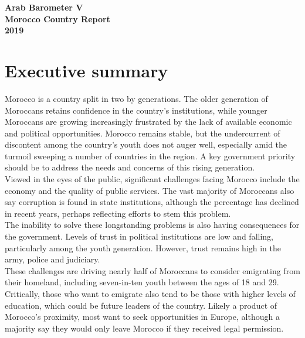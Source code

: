 \documentclass[12pt]{article}
\begin{document}
	\newpage
	\pagestyle{empty} 
	\vspace*{2in}
	\begin{center}
		\color{white}\Huge\textbf{Arab Barometer V} \\
		\vspace*{0.5in}
		\color{white}\LARGE\textbf{Morocco Country Report} \\
		\vspace*{4in}
		\color{white}\large\textbf{2019} \\
	\end{center}
	\newpage{}
	\color{gray}
	\color{gray}
	\pagestyle{fancy}
	\pagebreak
	\section*{Executive summary}
	Morocco is a country split in two by generations. The older generation of Moroccans retains confidence in the country's institutions, while younger Moroccans are growing increasingly frustrated by the lack of available economic and political opportunities. Morocco remains stable, but the undercurrent of discontent among the country's youth does not auger well, especially amid the turmoil sweeping a number of countries in the region. A key government priority should be to address the needs and concerns of this rising generation.\\
	
	\noindent Viewed in the eyes of the public, significant challenges facing Morocco include the economy and the quality of public services. The vast majority of Moroccans also say corruption is found in state institutions, although the percentage has declined in recent years, perhaps reflecting efforts to stem this problem.\\
	
	\noindent The inability to solve these longstanding problems is also having consequences for the government.  Levels of trust in political institutions are low and falling, particularly among the youth generation. However, trust remains high in the army, police and judiciary.\\
	
	\noindent These challenges are driving nearly half of Moroccans to consider emigrating from their homeland, including seven-in-ten youth between the ages of 18 and 29. Critically, those who want to emigrate also tend to be those with higher levels of education, which could be future leaders of the country. Likely a product of Morocco's proximity, most want to seek opportunities in Europe, although a majority say they would only leave Morocco if they received legal permission.\\
	
\end{document}
